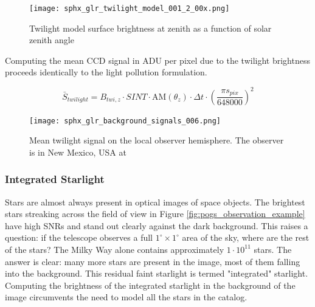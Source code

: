 \begin{figure}[ht]
  \centering
  \texttt{[image: sphx\_glr\_twilight\_model\_001\_2\_00x.png]}
  \caption{Twilight model surface brightness at zenith as a function of solar zenith angle}
  \label{fig:twilight_model}
\end{figure}

Computing the mean CCD signal in ADU per pixel due to the twilight brightness proceeds identically to the light pollution formulation. 

\begin{equation} \label{eq:twilight_adu}
  \bar{S}_{twilight} = B_{twi,z} \cdot SINT \cdot \textrm{AM}(\theta_z) \cdot \Delta t \cdot \left( \frac{\pi s_{pix}}{648000} \right)^2
\end{equation}


\begin{figure}[ht]
  \centering
  \texttt{[image: sphx\_glr\_background\_signals\_006.png]}
  \caption{Mean twilight signal on the local observer hemisphere. The observer is in New Mexico, USA at
  \pogslla}
  \label{fig:pollution_hemi}
\end{figure}

\subsubsection{Integrated Starlight}

Stars are almost always present in optical images of space objects. The brightest stars streaking across the field of view in Figure \ref{fig:pogs_observation_example} have high SNRs and stand out clearly against the dark background. This raises a question: if the telescope observes a full $1^\circ \times 1^\circ$ area of the sky, where are the rest of the stars? The Milky Way alone contains approximately $1\cdot10^{11}$ stars. The answer is clear: many more stars are present in the image, most of them falling into the background. This residual faint starlight is termed "integrated" starlight. Computing the brightness of the integrated starlight in the background of the image circumvents the need to model all the stars in the catalog.

